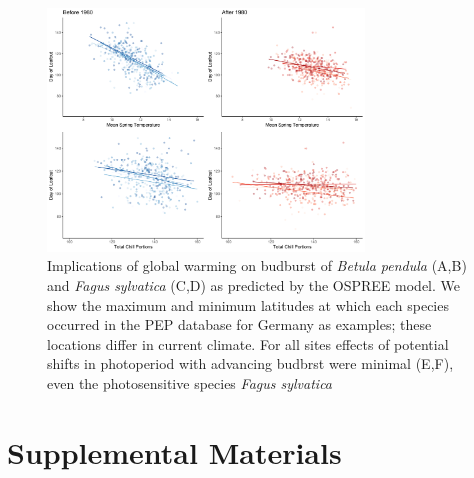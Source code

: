 \documentclass[11pt,letter]{article}
\begin{document}
\newpage
\begin{figure}[h!]
\centering
\noindent \includegraphics[width=0.75\textwidth]{..//..//analyses/bb_analysis/PEP_climate/figures/BETPEN_multruns_portions.pdf}
\caption{Implications of global warming on budburst of \emph{Betula pendula} (A,B) and \emph{Fagus sylvatica} (C,D) as predicted by the OSPREE model. We show the maximum and minimum latitudes at which each species occurred in the PEP database for Germany as examples; these locations differ in current climate. For all sites effects of potential shifts in photoperiod with advancing budbrst were minimal (E,F), even the photosensitive species \emph{Fagus sylvatica}}
\label{fig:pep}
\end{figure}

\section*{Supplemental Materials}
\end{document}
